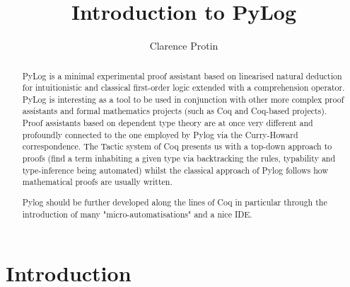 \documentclass[12pt,leqno]{article}
\numberwithin{equation}{section}
\begin{document}
	
	
	
	\title{Introduction to PyLog}
	\author{Clarence Protin}
	
	\maketitle

 \begin{abstract}
 PyLog is a minimal experimental proof assistant based on linearised natural deduction for intuitionistic and classical first-order logic extended with a comprehension operator. PyLog is interesting as a tool to be used in conjunction with other more complex proof assistants and formal mathematics projects (such as Coq and Coq-based projects).
 Proof assistants based on dependent type theory are at once very different and profoundly connected to the one employed by Pylog via the Curry-Howard correspondence. The Tactic system of Coq presents us with a top-down approach to proofs (find  a term inhabiting a given type via backtracking the rules, typability and type-inference being automated) whilst the classical approach of Pylog follows how mathematical proofs are usually written.
 
 Pylog should be further developed along the lines of Coq in particular through the introduction of many "micro-automatisations"  and a nice IDE.
 \end{abstract}
 
 
 \section*{Introduction}
 
\end{document}
